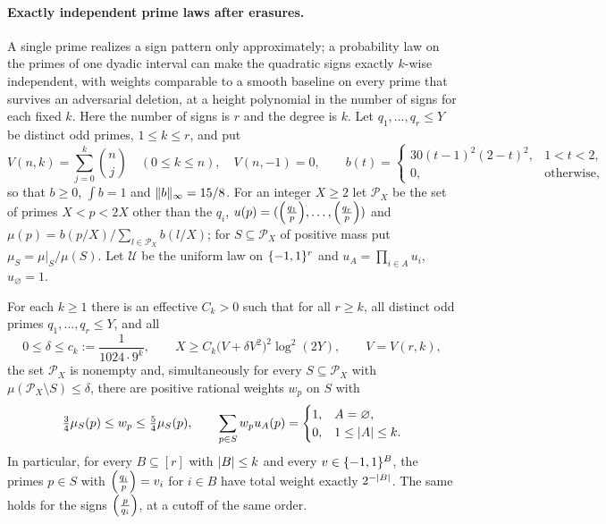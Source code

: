\paragraph{Exactly independent prime laws after erasures.}
A single prime realizes a sign pattern only approximately; a probability law on the primes of one dyadic
interval can make the quadratic signs exactly $k$-wise independent, with weights comparable to a smooth
baseline on every prime that survives an adversarial deletion, at a height polynomial in the number of
signs for each fixed $k$. Here the number of signs is $r$ and the degree is $k$. Let $q_1,\dots,q_r\le Y$ be
distinct odd primes, $1\le k\le r$, and put
\[
 V(n,k)=\sum_{j=0}^k\binom nj\quad(0\le k\le n),\quad V(n,-1)=0,\qquad
 b(t)=\begin{cases}30(t-1)^2(2-t)^2,&1<t<2,\\0,&\text{otherwise},\end{cases}
\]
so that $b\ge0$, $\int b=1$ and $\lVert b\rVert_\infty=15/8$. For an integer $X\ge2$ let $\mathcal P_X$ be the set of
primes $X<p<2X$ other than the $q_i$, $u(p)=(\Bigl(\frac{q_1}{p}\Bigr),\dots,\Bigl(\frac{q_r}{p}\Bigr))$ and
$\mu(p)=b(p/X)/\sum_{l\in\mathcal P_X}b(l/X)$; for $S\subseteq\mathcal P_X$ of positive mass put
$\mu_S=\mu|_S/\mu(S)$. Let $\mathcal U$ be the uniform law on $\{-1,1\}^r$ and $u_A=\prod_{i\in A}u_i$,
$u_\varnothing=1$.

\begin{theorem}\label{dir:thm:cubature}
For each $k\ge1$ there is an effective $C_k>0$ such that for all $r\ge k$, all distinct odd primes
$q_1,\dots,q_r\le Y$, and all
\[
 0\le\delta\le c_k:=\frac1{1024\cdot9^k},\qquad X\ge C_k\bigl(V+\delta V^2\bigr)^2\log^2(2Y),\qquad V=V(r,k),
\]
the set $\mathcal P_X$ is nonempty and, simultaneously for every $S\subseteq\mathcal P_X$ with
$\mu(\mathcal P_X\setminus S)\le\delta$, there are positive rational weights $w_p$ on $S$ with
\begin{equation}\label{dir:eq:cubature}
 \tfrac34\mu_S(p)\le w_p\le\tfrac54\mu_S(p),\qquad
 \sum_{p\in S}w_pu_A(p)=\begin{cases}1,&A=\varnothing,\\0,&1\le\lvert A\rvert\le k.\end{cases}
\end{equation}
In particular, for every $B\subseteq[r]$ with $\lvert B\rvert\le k$ and every $v\in\{-1,1\}^B$, the primes $p\in S$ with
$\Bigl(\frac{q_i}{p}\Bigr)=v_i$ for $i\in B$ have total weight exactly $2^{-\lvert B\rvert}$. The same holds for the signs
$\Bigl(\frac{p}{q_i}\Bigr)$, at a cutoff of the same order.
\end{theorem}

